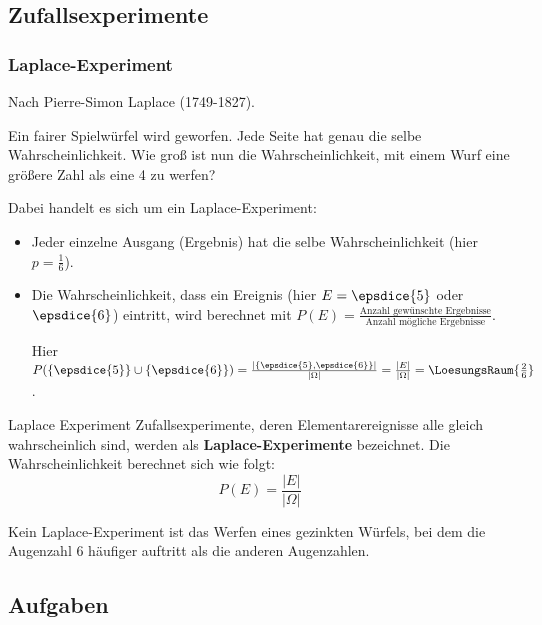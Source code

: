 
\subsection{Zufallsexperimente}

\subsubsection{Laplace-Experiment}
Nach Pierre-Simon Laplace (1749-1827).

Ein fairer Spielwürfel wird geworfen. Jede Seite hat genau die selbe
Wahrscheinlichkeit. Wie groß ist nun die Wahrscheinlichkeit, mit einem
Wurf eine größere Zahl als eine 4 zu werfen?


Dabei handelt es sich um ein Laplace-Experiment:
\begin{itemize}
\item Jeder einzelne Ausgang (Ergebnis) hat die selbe Wahrscheinlichkeit
      (hier $p = \frac{1}{6}$).
\item Die Wahrscheinlichkeit, dass ein Ereignis (hier $E = \epsdice{5}$
oder $\epsdice{6}$) eintritt, wird berechnet mit $P(E)
= \frac{\textrm{Anzahl gewünschte Ergebnisse}}{\textrm{Anzahl
mögliche Ergebnisse}}$.

Hier $P(\{\epsdice{5}\}\cup\{\epsdice{6}\}) = \frac{\left|\left\{\epsdice{5}, \epsdice{6}\right\}\right|}{|\Omega|}= \frac{|E|}{|\Omega|}=\LoesungsRaum{\frac{2}{6}}$.
\end{itemize}

\begin{definition}{Laplace Experiment}{}
  Zufallsexperimente, deren Elementarereignisse alle gleich wahrscheinlich sind, werden als
  \textbf{Laplace-Experimente} bezeichnet. Die Wahrscheinlichkeit berechnet sich wie folgt:
  $$P(E) = \frac{|E|}{|\Omega|}$$
\end{definition}


Kein Laplace-Experiment ist \zB das Werfen eines gezinkten Würfels,
bei dem die Augenzahl 6 häufiger auftritt als die anderen Augenzahlen.

\subsection*{Aufgaben}

